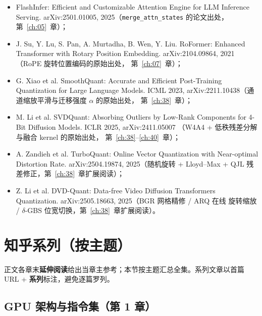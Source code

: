 \begin{itemize}
        Scaling. arXiv:2603.05451, 2026（lazy rescale / conditional
        rescaling 的原始出处，第~\ref{ch:27}、\ref{ch:29}、\ref{ch:32}~章）；
  \item FlashInfer: Efficient and Customizable Attention Engine for LLM
        Inference Serving. arXiv:2501.01005, 2025（\texttt{merge\_\allowbreak{}attn\_\allowbreak{}states}
        的论文出处，第~\ref{ch:05}~章）；
  \item J. Su, Y. Lu, S. Pan, A. Murtadha, B. Wen, Y. Liu. RoFormer:
        Enhanced Transformer with Rotary Position Embedding.
        arXiv:2104.09864, 2021（RoPE 旋转位置编码的原始出处，
        第~\ref{ch:07}~章）；
  \item G. Xiao et al. SmoothQuant: Accurate and Efficient Post-Training
        Quantization for Large Language Models. ICML 2023,
        arXiv:2211.10438（通道缩放平滑与迁移强度 $\alpha$ 的原始出处，
        第~\ref{ch:38}~章）；
  \item M. Li et al. SVDQuant: Absorbing Outliers by Low-Rank Components
        for 4-Bit Diffusion Models. ICLR 2025, arXiv:2411.05007
        （W4A4 + 低秩残差分解与融合 kernel 的原始出处，
        第~\ref{ch:38}--\ref{ch:40}~章）；
  \item A. Zandieh et al. TurboQuant: Online Vector Quantization with
        Near-optimal Distortion Rate. arXiv:2504.19874, 2025（随机旋转 +
        Lloyd--Max + QJL 残差修正，第~\ref{ch:38}~章扩展阅读）；
  \item Z. Li et al. DVD-Quant: Data-free Video Diffusion Transformers
        Quantization. arXiv:2505.18663, 2025（BGR 网格精修 / ARQ 在线
        旋转缩放 / $\delta$-GBS 位宽切换，第~\ref{ch:38}~章扩展阅读）。
\end{itemize}

\section{知乎系列（按主题）}

正文各章末\textbf{延伸阅读}给出当章主参考；本节按主题汇总全集。系列文章以首篇
URL + \textbf{系列}标注，避免逐篇罗列。

\subsection{GPU 架构与指令集（第 1 章）}

